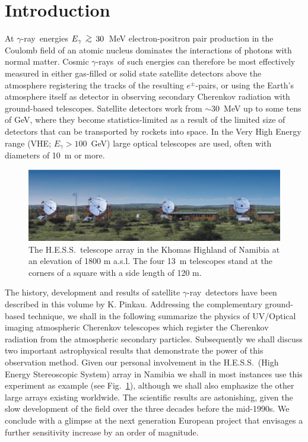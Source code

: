 \documentclass{svjour3x}                     %
\newcommand{\gsim}{\,\raisebox{0.2em}{$>$}\!\!\!\!\!
\raisebox{-0.25em}{$\sim$}\,}
\newcommand{\gr}{$\gamma$-ray}
\newcommand{\grs}{$\gamma$-rays}
\newcommand{\hess}{H.E.S.S.}
\begin{document}

\section{Introduction}
\label{intro}

At \gr\ energies $E_{\gamma}~ \gsim~ 30$~MeV electron-positron pair production
in the Coulomb field of an atomic nucleus dominates the interactions of photons
with normal matter. Cosmic \grs\ of such energies can therefore be most
effectively measured in either gas-filled or solid state satellite detectors
above the atmosphere registering the tracks of the resulting $e^{\pm}$-pairs, or
using the Earth's atmosphere itself as detector in observing secondary
Cherenkov radiation with ground-based telescopes. Satellite detectors work from
$\sim 30$~MeV up to some tens of GeV, where they become statistics-limited as a
result of the limited size of detectors that can be transported by rockets into
space. In the Very High Energy range (VHE; $E_{\gamma} > 100$~GeV) large
optical telescopes are used, often with diameters of 10~m or more.
%
\begin{figure}
  \includegraphics[width=\textwidth]{HESS_array.eps}
\caption[The \hess\ telescope array]{The \hess\ telescope array \cite{hesspic} in the Khomas Highland of
  Namibia at an elevation of 1800 m a.s.l. The four 13~m telescopes stand at the
  corners of a square with a side length of 120 m.}
\label{fig:1}       %
\end{figure}
%

The history, development and results of satellite \gr\ detectors have been
described in this volume by K. Pinkau. Addressing the complementary ground-based
technique, we shall in the following summarize the physics of UV/Optical
imaging atmospheric Cherenkov telescopes which register the Cherenkov radiation
from the atmospheric secondary particles. Subsequently we shall discuss two
important astrophysical results that demonstrate the power of this observation
method. Given our personal involvement in the \hess\ (High Energy Stereoscopic
System) array in Namibia we shall in most instances use this experiment as
example (see Fig.~\ref{fig:1}), although we shall also emphasize the other
large arrays existing worldwide. The scientific results are astonishing, given
the slow development of the field over the three decades before the
mid-1990s. We conclude with a glimpse at the next generation European project
that envisages a further sensitivity increase by an order of magnitude.
\end{document}
